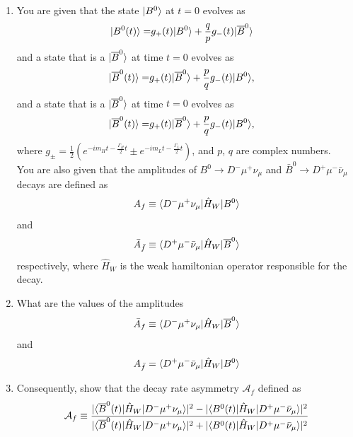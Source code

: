 \begin{enumerate}
\item[]
  You are given that the state $ |  {B}^{0} \rangle$ at $t=0$
  evolves as
  \begin{align*}
     | B^0 (t) \rangle=&
    g_+(t)  | B^0 \rangle+\frac{q}{p}g_-(t)
     | \overline{B}^0 \rangle
  \end{align*}
  and a state that is a $ | \overline{B}^0 \rangle$ at time $t=0$ evolves as
  \begin{align*}
     | \overline{B}^0 (t) \rangle=& g_+(t)  | \overline{B}^0 \rangle
    +\frac{p}{q}g_-(t)  | B^0 \rangle,
  \end{align*}
  and a state that is a $ | \overline{B}^0 \rangle$ at time $t=0$ evolves as
  \begin{align*}
     | \overline{B}^0 (t) \rangle=& g_+(t)  | \overline{B}^0 \rangle
    +\frac{p}{q}g_-(t)  | B^0 \rangle,
  \end{align*}
  where $g_{\pm}=\frac{1}{2}(e^{-im_Ht-\frac{\Gamma_H}{2}t}\pm
  e^{-im_Lt-\frac{\Gamma_L}{2}t})$, and $p$, $q$ are complex
  numbers.\\
  You are also given that the amplitudes of  $B^0\to  D^-\mu^+\nu_{\mu}$ and  $\bar{B}^0\to
  D^+\mu^-\bar{\nu}_{\mu}$ decays are defined as
  \[
  A_{f}\equiv  \langle D^-\mu^+\nu_{\mu} |\hat{H}_{W} | B^0 \rangle
  \]
  and
  \[
    \bar{A}_{\bar{f}}\equiv  \langle D^+\mu^-\bar{\nu}_{\mu} |\hat{H}_{W} | \overline{B}^0 \rangle
  \]
  respectively, where $\hat{H}_{W}$ is the weak hamiltonian operator responsible for the decay.
  \item What are the values of the amplitudes
   \[
    \bar{A}_{f}\equiv  \langle D^-\mu^+\nu_{\mu} |\hat{H}_{W} | \overline{B}^0 \rangle
  \]
  and
  \[
    A_{\bar{f}}= \langle D^+\mu^-\bar{\nu}_{\mu} |\hat{H}_{W} | B^0 \rangle
  \]
  \item
    Consequently, show that the decay rate asymmetry $\mathcal{A}_{f}$ defined as
  \[
   \mathcal{A}_{f} \equiv \frac{ | \langle \overline{B}^0(t) |\hat{H}_{W} | D^-\mu^+\nu_{\mu} \rangle|^2 -
     | \langle B^0(t) |\hat{H}_{W} | D^+\mu^-\bar{\nu}_{\mu} \rangle|^2} {  | \langle \overline{B}^0(t) |\hat{H}_{W} | D^-\mu^+\nu_{\mu} \rangle|^2 + | \langle B^0(t) |\hat{H}_{W} | D^+\mu^-\bar{\nu}_{\mu} \rangle|^2 }
\]
\end{enumerate}
